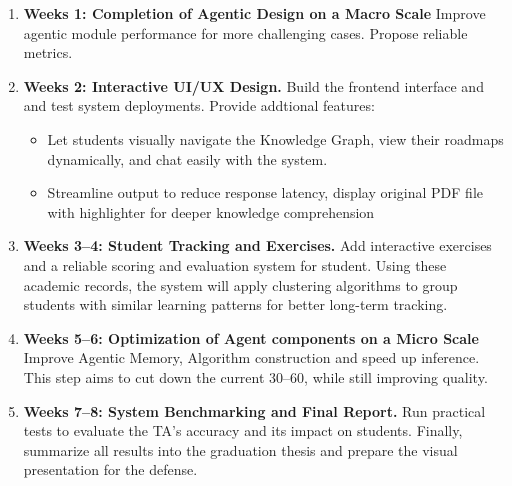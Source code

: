 \begin{enumerate}
    \item \textbf{Weeks 1: Completion of Agentic Design on a Macro Scale} Improve agentic module performance for more challenging cases. 
    Propose reliable metrics.
    \item \textbf{Weeks 2: Interactive UI/UX Design.} Build the frontend interface and and test system deployments. Provide addtional features:
    \begin{itemize}
        \item Let students visually navigate the Knowledge Graph, view their roadmaps dynamically, and chat easily with the system.
        \item Streamline output to reduce response latency, display original PDF file with highlighter for deeper knowledge comprehension
    \end{itemize}
    
    \item \textbf{Weeks 3--4: Student Tracking and Exercises.} Add interactive exercises and a reliable scoring and evaluation system for student. Using these academic records, the system will apply clustering algorithms to group students with similar learning patterns for better long-term tracking.

    \item \textbf{Weeks 5--6: Optimization of Agent components on a Micro Scale } Improve Agentic Memory, Algorithm construction and speed up inference. 
    This step aims to cut down the current 30--60, while still improving quality.
    
    
    \item \textbf{Weeks 7--8: System Benchmarking and Final Report.} Run practical tests to evaluate the TA's accuracy and its impact on students. 
    Finally, summarize all results into the graduation thesis and prepare the visual presentation for the defense.
\end{enumerate}